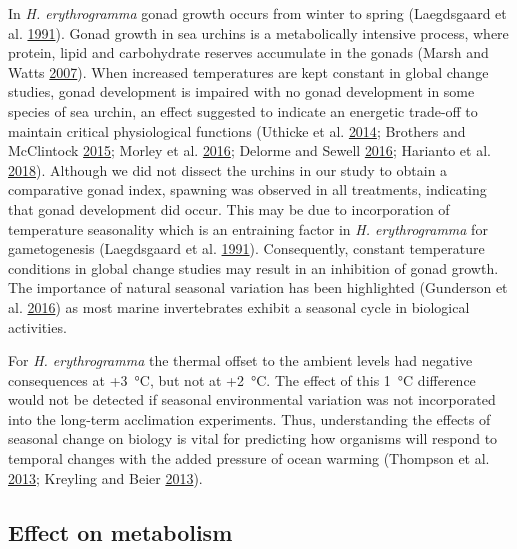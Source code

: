 \documentclass[a4paper,10pt, oneside]{memoir}
\begin{document}
In \textit{H. erythrogramma} gonad growth occurs from winter to spring (Laegdsgaard et al. \protect\hyperlink{ref-Laegdsgaard1991}{1991}).
Gonad growth in sea urchins is a metabolically intensive process, where protein, lipid and carbohydrate reserves accumulate in the gonads (Marsh and Watts \protect\hyperlink{ref-Marsh2007}{2007}).
When increased temperatures are kept constant in global change studies, gonad development is impaired with no gonad development in some species of sea urchin, an effect suggested to indicate an energetic trade-off to maintain critical physiological functions (Uthicke et al. \protect\hyperlink{ref-Uthicke2014}{2014}; Brothers and McClintock \protect\hyperlink{ref-Brothers2015}{2015}; Morley et al. \protect\hyperlink{ref-Morley2016}{2016}; Delorme and Sewell \protect\hyperlink{ref-Delorme2016}{2016}; Harianto et al. \protect\hyperlink{ref-Harianto2018}{2018}).
Although we did not dissect the urchins in our study to obtain a comparative gonad index, spawning was observed in all treatments, indicating that gonad development did occur.
This may be due to incorporation of temperature seasonality which is an entraining factor in \textit{H. erythrogramma} for gametogenesis (Laegdsgaard et al. \protect\hyperlink{ref-Laegdsgaard1991}{1991}).
Consequently, constant temperature conditions in global change studies may result in an inhibition of gonad growth.
The importance of natural seasonal variation has been highlighted (Gunderson et al. \protect\hyperlink{ref-Gunderson2016}{2016}) as most marine invertebrates exhibit a seasonal cycle in biological activities.

For \textit{H. erythrogramma} the thermal offset to the ambient levels had negative consequences at +\SI{3}{\celsius}, but not at +\SI{2}{\celsius}.
The effect of this \SI{1}{\celsius} difference would not be detected if seasonal environmental variation was not incorporated into the long-term acclimation experiments.
Thus, understanding the effects of seasonal change on biology is vital for predicting how organisms will respond to temporal changes with the added pressure of ocean warming (Thompson et al. \protect\hyperlink{ref-Thompson2013}{2013}; Kreyling and Beier \protect\hyperlink{ref-Kreyling2013}{2013}).

\hypertarget{effect-on-metabolism}{%
\subsection{Effect on metabolism}\label{effect-on-metabolism}}
\end{document}
